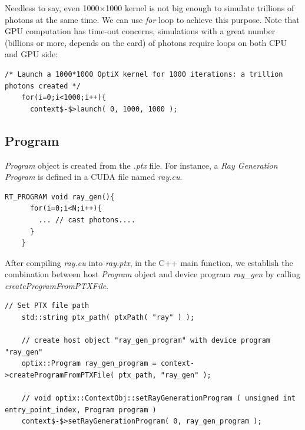Needless to say, even 1000$\times$1000 kernel is not big enough to simulate trillions of photons at the same time. We can use \textit{for} loop to achieve this purpose. Note that GPU computation has time-out concerns, simulations with a great number (billions or more, depends on the card) of photons require loops on both CPU and GPU side:
\begin{lstlisting}[mathescape]
    /* Launch a 1000*1000 OptiX kernel for 1000 iterations: a trillion photons created */
    for(i=0;i<1000;i++){   
      context$-$>launch( 0, 1000, 1000 );
\end{lstlisting}

\subsection{Program}
\textit{Program} object is created from the \textit{.ptx} file. For instance, a \textit{Ray Generation Program} is defined in a CUDA file named \textit{ray.cu}.
\begin{lstlisting}[mathescape]
    RT_PROGRAM void ray_gen(){
      for(i=0;i<N;i++){   
        ... // cast photons....
      }
    }
\end{lstlisting}
After compiling \textit{ray.cu} into \textit{ray.ptx}, in the C++ main function, we establish the combination between host \textit{Program} object and device program \textit{ray\_gen} by calling \textit{createProgramFromPTXFile}.
\begin{lstlisting}[mathescape]
    // Set PTX file path
    std::string ptx_path( ptxPath( "ray" ) );
    
    // create host object "ray_gen_program" with device program "ray_gen"
    optix::Program ray_gen_program = context->createProgramFromPTXFile( ptx_path, "ray_gen" );
    
    // void optix::ContextObj::setRayGenerationProgram ( unsigned int entry_point_index, Program program )
    context$-$>setRayGenerationProgram( 0, ray_gen_program );
\end{lstlisting}


